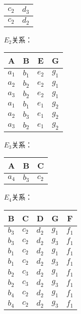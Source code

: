 \documentclass[UTF8]{ctexart}
\begin{document}
\begin{itemize}
\begin{enumerate}
\begin{table}[H]
\begin{tabular}{|c|c|}
				$c_{2}$ & $d_{3}$\\\hline	
								
				$c_{2}$ & $d_{2}$\\\hline					
			\end{tabular}
		\end{table}
	
		$E_{2}$关系：
		\begin{table}[H]
			\begin{tabular}{|c|c|c|c|}
				\hline
				A & B & E & G \\\hline
				$a_{1}$ & $b_{1}$ & $e_{2}$ & $g_{1}$ \\\hline
				$a_{2}$ & $b_{2}$ & $e_{2}$ & $g_{1}$ \\\hline
				$a_{3}$ & $b_{2}$ & $e_{2}$ & $g_{1}$ \\\hline
				$a_{1}$ & $b_{1}$ & $e_{1}$ & $g_{2}$ \\\hline
				$a_{2}$ & $b_{3}$ & $e_{1}$ & $g_{2}$ \\\hline
				$a_{3}$ & $b_{2}$ & $e_{1}$ & $g_{2}$ \\\hline
			\end{tabular}
		\end{table}
	
		$E_{3}$关系：
		\begin{table}[H]
			\begin{tabular}{|c|c|c|}
				\hline
				A & B & C \\\hline
				$a_{4}$ & $b_{3}$ & $c_{2}$ \\\hline
			\end{tabular}
		\end{table}
	
		$E_{4}$关系：
		\begin{table}[H]
			\begin{tabular}{|c|c|c|c|c|}
				\hline
				B & C & D & G & F \\\hline
				$b_{3}$ & $c_{2}$ & $d_{2}$ & $g_{1}$ & $f_{1}$ \\\hline
				$b_{3}$ & $c_{2}$ & $d_{2}$ & $g_{3}$ & $f_{1}$ \\\hline
				$b_{1}$ & $c_{2}$ & $d_{2}$ & $g_{1}$ & $f_{1}$ \\\hline
				$b_{1}$ & $c_{2}$ & $d_{2}$ & $g_{3}$ & $f_{1}$ \\\hline
				$b_{2}$ & $c_{3}$ & $d_{2}$ & $g_{1}$ & $f_{1}$ \\\hline
				$b_{2}$ & $c_{3}$ & $d_{2}$ & $g_{3}$ & $f_{1}$ \\\hline
				$b_{4}$ & $c_{2}$ & $d_{2}$ & $g_{1}$ & $f_{1}$ \\\hline
				$b_{4}$ & $c_{2}$ & $d_{2}$ & $g_{3}$ & $f_{1}$ \\\hline
			\end{tabular}
		\end{table}
		

\end{enumerate}
\end{itemize}
\end{document}
